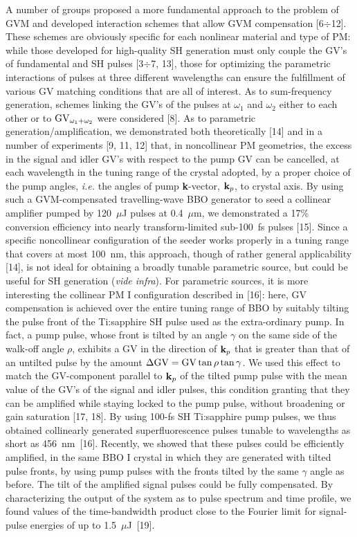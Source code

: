 \documentclass[times]{jtitauth}
\begin{document}
A number of groups proposed a more fundamental approach to the
problem of GVM and developed interaction schemes that allow GVM
compensation [6$\div$12]. These schemes are obviously specific for
each nonlinear material and type of PM: while those developed for
high-quality SH generation must only couple the GV's of
fundamental and SH pulses [3$\div$7, 13], those for optimizing the
parametric interactions of pulses at three different wavelengths
can ensure the fulfillment of various GV matching conditions that
are all of interest. As to sum-frequency generation, schemes
linking the GV's of the pulses at $\omega_1$ and $\omega_2$ either
to each other or to ${\rm GV}_{\omega_1 + \omega_2}$ were
considered [8]. As to parametric generation/amplification, we
demonstrated both theoretically [14] and in a number of
experiments [9, 11, 12] that, in noncollinear PM geometries, the
excess in the signal and idler GV's with respect to the pump GV
can be cancelled, at each wavelength in the tuning range of the
crystal adopted, by a proper choice of the pump angles, {\it i.e.}
the angles of pump {\bf k}-vector, ${\rm{\bf k}}_p$, to crystal
axis. By using such a GVM-compensated travelling-wave BBO
generator to seed a collinear amplifier pumped by 120~$\mu$J
pulses at 0.4~$\mu$m, we demonstrated a 17\% conversion efficiency
into nearly transform-limited sub-100~fs pulses [15]. Since a
specific noncollinear configuration of the seeder works properly
in a tuning range that covers at most 100~nm, this approach,
though of rather general applicability [14], is not ideal for
obtaining a broadly tunable parametric source, but could be useful
for SH generation ({\it vide infra}). For parametric sources, it
is more interesting the collinear PM I configuration described in
[16]: here, GV compensation is achieved over the entire tuning
range of BBO by suitably tilting the pulse front of the
Ti:sapphire SH pulse used as the extra-ordinary pump. In fact, a
pump pulse, whose front is tilted by an angle $\gamma$ on the same
side of the walk-off angle $\rho$, exhibits a GV in the direction
of ${\rm \bf k}_p$ that is greater than that of an untilted pulse
by the amount $\Delta{\rm GV = GV} \tan \rho \tan \gamma$. We used
this effect to match the GV-component parallel to ${\rm \bf k}_p$
of the tilted pump pulse with the mean value of the GV's of the
signal and idler pulses, this condition granting that they can be
amplified while staying locked to the pump pulse, without
broadening or gain saturation [17, 18]. By using 100-fs SH
Ti:sapphire pump pulses, we thus obtained collinearly generated
superfluorescence pulses tu\-nable to wavelengths as short as
456~nm~[16]. Recently, we showed that these pulses could be
efficiently amplified, in the same BBO I crystal in which they are
generated with tilted pulse fronts, by using pump pulses with the
fronts tilted by the same $\gamma$ angle as before. The tilt of
the amplified signal pulses could be fully compensated. By
characterizing the output of the system as to pulse spectrum and
time profile, we found va\-lues of the time-bandwidth product
close to the Fourier limit for signal-pulse energies of up to
1.5~$\mu$J~[19].
\end{document}
